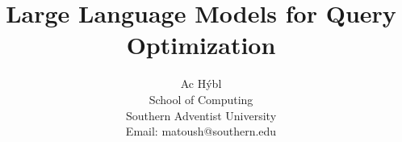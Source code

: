 \title{Large Language Models for Query Optimization}
\author{Ac Hýbl\\School of Computing\\Southern Adventist University\\Email: matoush@southern.edu}

\maketitle